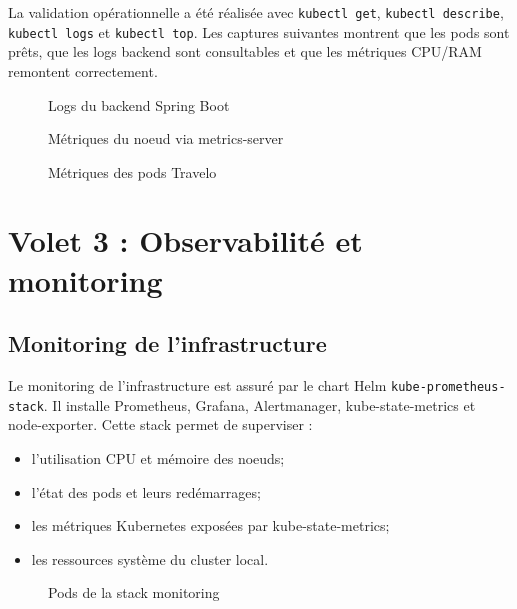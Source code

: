 \documentclass[11pt,a4paper]{article}
\begin{document}
La validation opérationnelle a été réalisée avec \texttt{kubectl get}, \texttt{kubectl describe}, \texttt{kubectl logs} et \texttt{kubectl top}. Les captures suivantes montrent que les pods sont prêts, que les logs backend sont consultables et que les métriques CPU/RAM remontent correctement.

\begin{figure}[H]
    \centering
    
    \caption{Logs du backend Spring Boot}
\end{figure}

\begin{figure}[H]
    \centering
    
    \caption{Métriques du noeud via metrics-server}
\end{figure}

\begin{figure}[H]
    \centering
    
    \caption{Métriques des pods Travelo}
\end{figure}

\FloatBarrier
\section{Volet 3 : Observabilité et monitoring}

\subsection{Monitoring de l'infrastructure}

Le monitoring de l'infrastructure est assuré par le chart Helm \texttt{kube-prometheus-stack}. Il installe Prometheus, Grafana, Alertmanager, kube-state-metrics et node-exporter. Cette stack permet de superviser :
\begin{itemize}
    \item l'utilisation CPU et mémoire des noeuds;
    \item l'état des pods et leurs redémarrages;
    \item les métriques Kubernetes exposées par kube-state-metrics;
    \item les ressources système du cluster local.
\end{itemize}

\begin{figure}[H]
    \centering
    
    \caption{Pods de la stack monitoring}
\end{figure}
\end{document}
